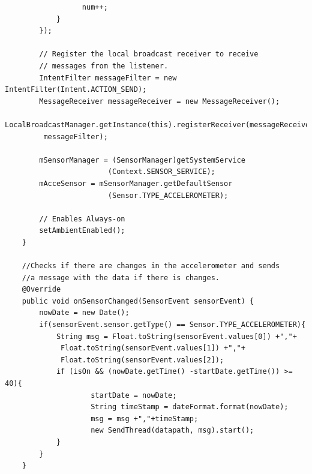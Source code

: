 \documentclass[12pt]{book}
\numberwithin{equation}{section}
\begin{document}
\begin{appendices}
\begin{verbatim}
                  num++;
            }
        });

        // Register the local broadcast receiver to receive 
        // messages from the listener.
        IntentFilter messageFilter = new IntentFilter(Intent.ACTION_SEND);
        MessageReceiver messageReceiver = new MessageReceiver();
        LocalBroadcastManager.getInstance(this).registerReceiver(messageReceiver,
         messageFilter);

        mSensorManager = (SensorManager)getSystemService
        				(Context.SENSOR_SERVICE);
        mAcceSensor = mSensorManager.getDefaultSensor
        				(Sensor.TYPE_ACCELEROMETER);

        // Enables Always-on
        setAmbientEnabled();
    }

	//Checks if there are changes in the accelerometer and sends
	//a message with the data if there is changes.
    @Override
    public void onSensorChanged(SensorEvent sensorEvent) {
        nowDate = new Date();
        if(sensorEvent.sensor.getType() == Sensor.TYPE_ACCELEROMETER){
            String msg = Float.toString(sensorEvent.values[0]) +","+
             Float.toString(sensorEvent.values[1]) +","+
             Float.toString(sensorEvent.values[2]);
            if (isOn && (nowDate.getTime() -startDate.getTime()) >= 40){
                    startDate = nowDate;
                    String timeStamp = dateFormat.format(nowDate);
                    msg = msg +","+timeStamp;
                    new SendThread(datapath, msg).start();
            }
        }
    }

\end{verbatim}

\end{appendices}
\end{document}

